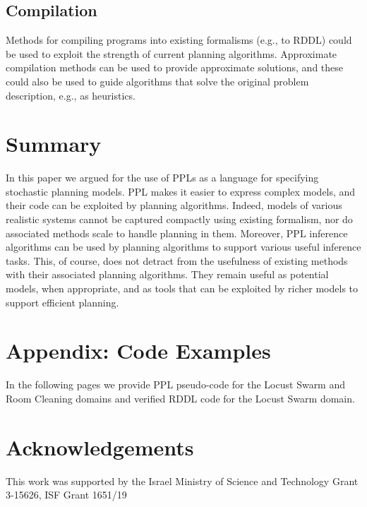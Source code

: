 \documentclass[letterpaper]{article} %
\theoremstyle{definition}
\begin{document}
\subsection{Compilation}
Methods for compiling programs into existing formalisms (e.g., to RDDL) could be used to exploit the strength of current planning algorithms.
Approximate compilation methods can be used to provide
approximate solutions, and these could also be used to guide algorithms that solve the original problem description, e.g., as heuristics.

\section{Summary}
In this paper we argued for the use of PPLs as a language for specifying stochastic planning models. PPL makes it easier to express complex models, and their code can be exploited by planning algorithms. Indeed, models of various realistic systems cannot be captured compactly using existing formalism,
nor do associated methods scale to handle planning in them.
Moreover, PPL inference algorithms can be used by planning algorithms to support various useful inference tasks. This, of course, does not detract from the usefulness of existing methods with their associated planning algorithms. They remain useful as potential models, when appropriate, and as tools that can be exploited by richer models to support efficient
planning.


%
\section{Appendix: Code Examples}
In the following pages we provide PPL pseudo-code for the Locust Swarm and
Room Cleaning domains and verified RDDL code for the Locust Swarm domain.
\onecolumn


\bigskip
\bigskip


\twocolumn
\section{Acknowledgements}
This work was supported by the Israel Ministry of Science and Technology Grant 3-15626, ISF Grant
1651/19 
\clearpage

\end{document}
